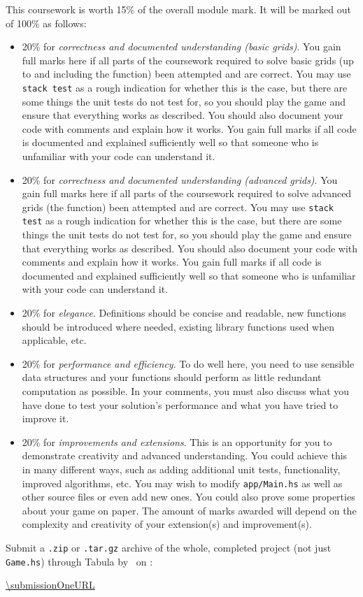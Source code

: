 This coursework is worth 15\% of the overall module mark. It will be marked out of 100\% as follows:
\begin{itemize}
	\item 20\% for \emph{correctness and documented understanding (basic grids)}. You gain full marks here if all parts of the coursework required to solve basic grids (up to and including the  function) been attempted and are correct. You may use \texttt{\small stack test} as a rough indication for whether this is the case, but there are some things the unit tests do not test for, so you should play the game and ensure that everything works as described. You should also document your code with comments and explain how it works. You gain full marks if all code is documented and explained sufficiently well so that someone who is unfamiliar with your code can understand it.
	
	\item 20\% for \emph{correctness and documented understanding (advanced grids)}. You gain full marks here if all parts of the coursework required to solve advanced grids (the  function) been attempted and are correct. You may use \texttt{\small stack test} as a rough indication for whether this is the case, but there are some things the unit tests do not test for, so you should play the game and ensure that everything works as described. You should also document your code with comments and explain how it works. You gain full marks if all code is documented and explained sufficiently well so that someone who is unfamiliar with your code can understand it.
	
	\item 20\% for \emph{elegance}. Definitions should be concise and readable, new functions should be introduced where needed, existing library functions used when applicable, etc.
	 
	\item 20\% for \emph{performance and efficiency}. To do well here, you need to use sensible data structures and your functions should perform as little redundant computation as possible. In your comments, you must also discuss what you have done to test your solution's performance and what you have tried to improve it. %
	
	\item 20\% for \emph{improvements and extensions}. This is an opportunity for you to demonstrate creativity and advanced understanding. You could achieve this in many different ways, such as adding additional unit tests, functionality, improved algorithms, etc. You may wish to modify \texttt{\small app/Main.hs} as well as other source files or even add new ones. You could also prove some properties about your game on paper. The amount of marks awarded will depend on the complexity and creativity of your extension(s) and improvement(s).
\end{itemize}
Submit a \texttt{\small .zip} or \texttt{\small .tar.gz} archive of the whole, completed project (not just \texttt{\small Game.hs}) through Tabula by \deadlineOneTime\ on \deadlineOneDate:
\begin{center} 
	\url{\submissionOneURL}
\end{center}
